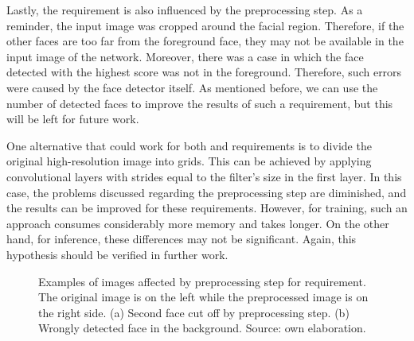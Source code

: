 Lastly, the \otherfacesortoys requirement is also influenced by the preprocessing step. As a reminder, the input image was cropped around the facial region. Therefore, if the other faces are too far from the foreground face, they may not be available in the input image of the network. Moreover, there was a case in which the face detected with the highest score was not in the foreground. Therefore, such errors were caused by the face detector itself. As mentioned before, we can use the number of detected faces to improve the results of such a requirement, but this will be left for future work.


One alternative that could work for both \pixelation and \otherfacesortoys requirements is to divide the original high-resolution image into grids. This can be achieved by applying convolutional layers with strides equal to the filter’s size in the first layer. In this case, the problems discussed regarding the preprocessing step are diminished, and the results can be improved for these requirements. However, for training, such an approach consumes considerably more memory and takes longer. On the other hand, for inference, these differences may not be significant. Again, this hypothesis should be verified in further work.

\begin{figure}[htbp]
\centering
{}
\hfill
{}    
\caption{Examples of images affected by preprocessing step for \otherfacesortoys requirement. The original image is on the left while the preprocessed image is on the right side. (a) Second face cut off by preprocessing step. (b) Wrongly detected face in the background. Source: own elaboration.}
\label{fig:otherface_errors}
\end{figure}

